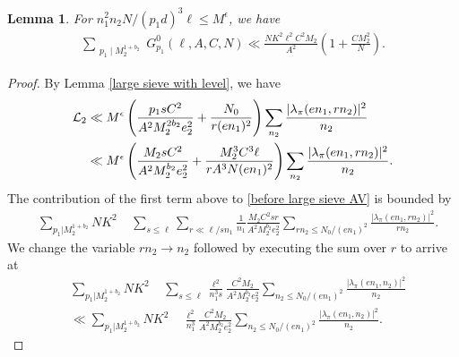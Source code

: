 \documentclass[12pt,a4paper,twoside, reqno]{amsart}
\newcommand{\e}[2]{e\left(\frac{#1}{#2}\right)}
\newtheorem{lemma}{Lemma}
\begin{document}
\begin{lemma}\label{small n bound}
For $ n_1^2n_2N/(p_1d)^3 \ell \leq M^\epsilon$,    we have 
    \begin{align*}
        \mathop{\sum}_{\substack{p_1 \mid M_2^{1+b_2} }}  G_{p_1}^{0}(\ell, A,C,N) \ll \frac{NK^2 {\ell^2} C^2 M_2}{A^2    }  \left(1 +\frac{C M_2^2}{ N}\right).
    \end{align*}
\end{lemma}
\begin{proof}
 By  Lemma \eqref{large sieve with level}, we have
\begin{align}\label{l2 bound}
    \mathcal{L}_2 &\ll M^{\epsilon}\left( \frac{p_1sC^2 }{A^2 M_2^{2b_2}e_2^2 } +\frac{N_0}{r(en_1)^2}\right) \sum_{n_2} \frac{{ |\lambda_\pi(en_1,rn_2)|^2}}{{ n_2}  } \notag\\
    &\ll M^{\epsilon}\left( \frac{M_2sC^2 }{A^2 M_2^{b_2}e_2^2 } +\frac{M_2^3C^3 \ell}{ r A^3N(en_1)^2}\right) \sum_{n_2} \frac{{ |\lambda_\pi(en_1,rn_2)|^2}}{{ n_2}  }.
\end{align}
The contribution of  the first term above to \eqref{before large sieve AV} is bounded by 
 \begin{align*}
     &   \sum_{p_1|M_2^{1+b_2}}NK^2 \mathop{\sum_{\substack {e_1e_2 \ll N_1  \\e_1 \mid M_2^{1+b_2} }   }} \mathop{\sum_{\substack {en_1  \asymp N_1 }   }} \sum_{s \leq \ell} \sum_{r \ll \ell/s n_1}   \frac{1}{n_1}  \frac{M_2 C^2s  r}{ A^2M_2^{b_2}e_2^2  } \sum_{rn_2 \leq N_0/(en_1)^2}\frac{ { |\lambda_\pi(en_1,rn_2)|^2 }}{ { rn_2}  }.
\end{align*}
We change the variable $rn_2 \rightarrow n_2$  followed by executing the sum over $r$ to arrive at 
\begin{align*}
    &  \sum_{p_1|M_2^{1+b_2}}NK^2 \mathop{\sum_{\substack {e_1e_2 \ll N_1  \\e_1 \mid M_2^{1+b_2} }   }}  \mathop{\sum_{\substack {en_1  \asymp N_1 }   }} \sum_{s \leq \ell}    \frac{\ell^2}{n_1^3 s} \frac{C^2 M_2 }{A^2  M_2^{ b_2} e_2^2 }  \sum_{n_2 \leq  N_0/(en_1)^2}\frac{ { |\lambda_\pi(en_1,n_2)|^2 }}{ { n_2}  }     \\
     &\ll  \sum_{p_1|M_2^{1+b_2}}NK^2 \mathop{\sum_{\substack {e_1e_2 \ll N_1  \\e_1 \mid M_2^{1+b_2} }   }}  \mathop{\sum_{\substack {en_1  \asymp N_1 }   }}     \frac{\ell^2}{n_1^3 } \frac{C^2 M_2}{A^2  M_2^{ b_2} e_2^2 }  \sum_{n_2 \leq  N_0/(en_1)^2}\frac{ { |\lambda_\pi(en_1,n_2)|^2 }}{ { n_2}  }  .

\end{align*}
\end{proof}
\end{document}

